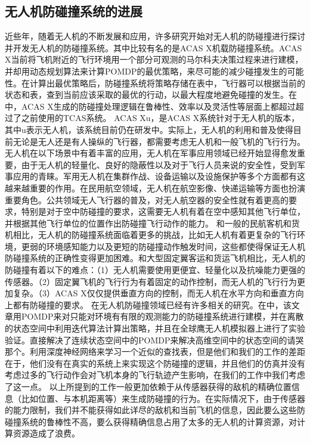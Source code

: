 \documentclass{article}
\begin{document}
\subsection{无人机防碰撞系统的进展}
近些年，随着无人机的不断发展和应用，许多研究开始对无人机的防碰撞进行探讨并开发无人机的防碰撞系统。其中比较有名的是ACAS X机载防碰撞系统\cite{8}。ACAS X当前将飞机附近的飞行环境用一个部分可观测的马尔科夫决策过程来进行建模，并却用动态规划算法来计算POMDP的最优策略，来尽可能的减少碰撞发生的可能性。在计算出最优策略后，防碰撞系统将策略存储在表中，飞行器可以根据当前的状态和表，查到当前应该采取的最优的行动，以最大程度地避免碰撞的发生。在\cite{8}中，ACAS X生成的防碰撞处理逻辑在鲁棒性、效率以及灵活性等层面上都超过超过了之前使用的TCAS系统。
ACAS Xu，是ACAS X系统针对于无人机的版本，其中u表示无人机，该系统目前仍在研发中。实际上，无人机的利用和普及使得目前无论是无人还是有人操纵的飞行器，都需要考虑无人机和一般飞机的飞行行为。无人机在以下场景中有着丰富的应用，无人机在军事应用领域已经开始显得愈发重要，由于无人机的轻量化、良好的隐蔽性以及对于飞行人员来说的安全性，受到军事应用的青睐。军用无人机在集群作战、设备运输以及设施保护等多个方面都有这越来越重要的作用。在民用航空领域，无人机在航空影像、快递运输等方面也扮演重要角色。公共领域无人飞行器的普及，对无人航空器的安全性就有着更高的要求，特别是对于空中防碰撞的要求，这需要无人机有着在空中感知其他飞行单位，并根据其他飞行单位的位置作出防碰撞飞行动作的能力。
和一般的民航客机和货机相比，无人机的防碰撞系统面临着更多的挑战，比如无人机有着更复杂的飞行环境，更弱的环境感知能力以及更短的防碰撞动作触发时间，这些都使得保证无人机防碰撞系统的正确性变得更加困难。和大型固定翼客运和货运飞机相比\cite{12}，无人机的防碰撞有着以下的难点：（1）无人机需要使用更便宜、轻量化以及抗噪能力更强的传感器。（2）固定翼飞机的飞行行为有着固定的动作控制，而无人机的飞行行为更加复杂。（3）ACAS X仅仅提供垂直方向的控制，而无人机在水平方向和垂直方向上都有防碰撞的要求。
在无人机防碰撞领域已经有许多相关的研究\cite{1,5,20}。在\cite{20}中，该文章用POMDP来对只能对环境有有限的观测能力的防碰撞系统进行建模，并在离散的状态空间中利用迭代算法计算出策略，并且在全球鹰无人机模拟器上进行了实验验证\cite{1}。\cite{1}直接解决了连续状态空间中的POMDP来解决高维空间中的状态空间的请哭那个。\cite{5}利用深度神经网络来学习一个近似的查找表，但是他们和我们的工作的差距在于，他们没有在真实的系统上来实现这个防碰撞的逻辑，并且他们的仿真并没有考虑过多的飞行动作会对飞机本身的飞行轨迹产生影响，在我们的工作中我们考虑了这一点。
以上所提到的工作一般更加依赖于从传感器获得的敌机的精确位置信息（比如位置、与本机距离等）来生成防碰撞的行为。在实际情况下，由于传感器的能力限制，我们并不能获得如此详尽的敌机和当前飞机的信息，因此要么这些防碰撞系统的鲁棒性不高，要么获得精确信息占用了太多的无人机的计算资源，对计算资源造成了浪费。
\end{document}
